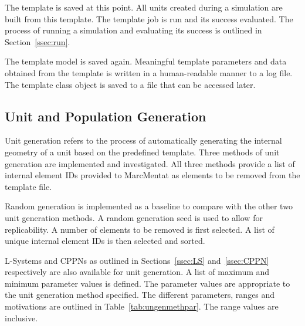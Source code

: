 The template is saved at this point. All units created during a simulation are built from this template. The template job is run and its success evaluated. The process of running a simulation and evaluating its success is outlined in Section~\ref{ssec:run}.

The template model is saved again. Meaningful template parameters and data obtained from the template is written in a human-readable manner to a log file. The template class object is saved to a file that can be accessed later.

\subsection{Unit and Population Generation}
\label{ssec:uapg}

Unit generation refers to the process of automatically generating the internal geometry of a unit based on the predefined template. Three methods of unit generation are implemented and investigated. All three methods provide a list of internal element IDs provided to MarcMentat as elements to be removed from the template file.

Random generation is implemented as a baseline to compare with the other two unit generation methods. A random generation seed is used to allow for replicability. A number of elements to be removed is first selected. A list of unique internal element IDs is then selected and sorted.

L-Systems and CPPNs as outlined in Sections~\ref{ssec:LS} and~\ref{ssec:CPPN} respectively are also available for unit generation. A list of maximum and minimum parameter values is defined. The parameter values are appropriate to the unit generation method specified. The different parameters, ranges and motivations are outlined in Table~\ref{tab:ungenmethpar}. The range values are inclusive.

